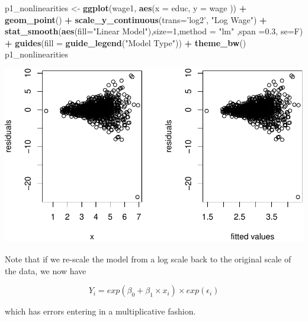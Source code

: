 \documentclass[]{book}
\newenvironment{Shaded}{\begin{snugshade}}{\end{snugshade}}
\newcommand{\DataTypeTok}[1]{\textcolor[rgb]{0.13,0.29,0.53}{#1}}
\newcommand{\DecValTok}[1]{\textcolor[rgb]{0.00,0.00,0.81}{#1}}
\newcommand{\FloatTok}[1]{\textcolor[rgb]{0.00,0.00,0.81}{#1}}
\newcommand{\KeywordTok}[1]{\textcolor[rgb]{0.13,0.29,0.53}{\textbf{#1}}}
\newcommand{\NormalTok}[1]{#1}
\newcommand{\OperatorTok}[1]{\textcolor[rgb]{0.81,0.36,0.00}{\textbf{#1}}}
\newcommand{\StringTok}[1]{\textcolor[rgb]{0.31,0.60,0.02}{#1}}
\begin{document}
\begin{Shaded}
\begin{Highlighting}[]
\NormalTok{p1_nonlinearities <-}\StringTok{ }\KeywordTok{ggplot}\NormalTok{(wage1, }\KeywordTok{aes}\NormalTok{(}\DataTypeTok{x =}\NormalTok{ educ, }\DataTypeTok{y =}\NormalTok{ wage )) }\OperatorTok{+}
\StringTok{  }\KeywordTok{geom_point}\NormalTok{()   }\OperatorTok{+}\StringTok{ }
\StringTok{  }\KeywordTok{scale_y_continuous}\NormalTok{(}\DataTypeTok{trans=}\StringTok{'log2'}\NormalTok{, }\StringTok{"Log Wage"}\NormalTok{) }\OperatorTok{+}\StringTok{ }
\StringTok{  }\KeywordTok{stat_smooth}\NormalTok{(}\KeywordTok{aes}\NormalTok{(}\DataTypeTok{fill=}\StringTok{"Linear Model"}\NormalTok{),}\DataTypeTok{size=}\DecValTok{1}\NormalTok{,}\DataTypeTok{method =} \StringTok{"lm"}\NormalTok{ ,}\DataTypeTok{span =}\FloatTok{0.3}\NormalTok{, }\DataTypeTok{se=}\NormalTok{F) }\OperatorTok{+}\StringTok{ }
\StringTok{  }\KeywordTok{guides}\NormalTok{(}\DataTypeTok{fill =} \KeywordTok{guide_legend}\NormalTok{(}\StringTok{"Model Type"}\NormalTok{)) }\OperatorTok{+}\StringTok{ }
\StringTok{  }\KeywordTok{theme_bw}\NormalTok{()}
\NormalTok{p1_nonlinearities}
\end{Highlighting}
\end{Shaded}

\includegraphics{MEM5220_R_files/figure-latex/unnamed-chunk-55-1.pdf}

Note that if we re-scale the model from a log scale back to the original
scale of the data, we now have

\begin{equation}
Y_{i} = exp(\beta_{0} + \beta_{1} \times x_{i})  \times exp(\epsilon_{i})
\end{equation}

which has errors entering in a multiplicative fashion.
\end{document}

